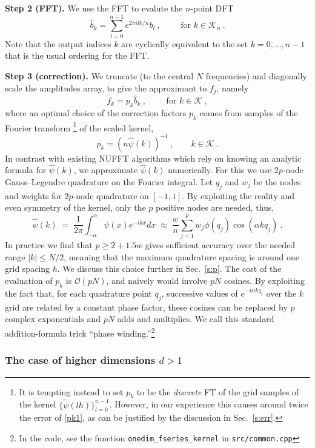\documentclass[10pt]{article}
\newcommand{\be}{\begin{equation}}
\newcommand{\ee}{\end{equation}}
\newcommand{\bigO}{{\mathcal O}}
\newcommand{\KK}{{\mathcal K}}
\newcommand{\ppsi}{{\tilde\psi}}   %
\newcommand{\al}{\alpha}           %
\begin{document}
{\bf Step 2 (FFT).}
We use the FFT to evalute the $n$-point DFT
\be
\hat{b}_k = \sum_{l=0}^{n-1} e^{2\pi i lk/n} b_l ~, \qquad \mbox{ for } k\in\KK_n
~.
\label{dft1}
\ee
Note that the output indices $k$ are cyclically equivalent to the
set $k=0,\dots,n-1$ that is the usual ordering for the FFT.

{\bf Step 3 (correction).}
We truncate (to the central $N$ frequencies) and
diagonally scale the amplitudes array, to give
the approximant to $f_j$, namely
\be
\tilde f_k = p_k \hat{b}_k ~, \qquad \mbox{ for } k\in\KK
~,
\ee
where an optimal choice of the correction factors $p_k$ comes from
samples of the Fourier transform%
\footnote{It is tempting instead to set $p_k$ to be the {\em discrete} FT
  of the grid samples of the kernel $\{\ppsi(lh)\}_{l=0}^{n-1}$.
  However, in our
  experience this causes around twice the error of \eqref{pk1},
  as can be justified by the discussion in Sec.~\ref{s:err}.}
of the scaled kernel,
\be p_k = (n \hat\psi(k))^{-1}~, \qquad k\in\KK
\label{pk1}
~.
\ee
In contrast with existing NUFFT algorithms
which rely on knowing an analytic formula for $\hat\psi(k)$,
we approximate $\hat\psi(k)$
numerically. For this we use $2p$-node Gauss--Legendre quadrature
on the Fourier integral. Let $q_j$ and $w_j$ be the nodes and weights
for $2p$-node quadrature on $[-1,1]$.
By exploiting the reality and even symmetry of the kernel,
only the $p$ positive nodes are needed, thus,
$$
\hat\psi(k) \;=\; 
\frac{1}{2\pi} \int_{-\al}^{\al} \psi(x) e^{-ikx} dx
\;\approx\;
\frac{w}{n} \sum_{j=1}^p w_j \phi(q_j) \cos (\al k q_j)
~.
$$
In practice we find that $p\ge 2+1.5 w$ gives sufficient accuracy
over the needed range $|k|\le N/2$,
meaning that the maximum quadrature spacing is around one
grid spacing $h$.
We discuss this choice further in Sec.~\ref{s:p}.
The cost of the evaluation of $p_k$ is $\bigO(pN)$,
and naively would involve $pN$ cosines.
By exploiting the fact that, for each quadrature point $q_j$,
successive values of $e^{-i \al k q_j}$ over the $k$ grid are
related by a constant phase factor, these cosines
can be replaced by $p$ complex exponentials and $pN$ adds and multiplies.
We call this standard addition-formula trick
``phase winding.''\footnote{In the code, see the function
  {\tt onedim\_fseries\_kernel} in {\tt src/common.cpp}}
  


\subsubsection{The case of higher dimensions $d>1$}
\end{document}
